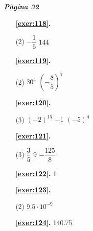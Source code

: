 \hyperlink{page.32}{\textbf{\em Pàgina 32}}
\begin{enumerate}



 \item[\fontfamily{phv}\selectfont\color{blue}\textbf{\ref{exer:118}. }] \label{ans:118}
 \begin{tasks}[column-sep=1em, item-indent=1.3333em](2)
	 \task $-\dfrac {1}{6}$
	 \task $144$
\end{tasks}
 \end{enumerate}
\begin{enumerate}



 \item[\fontfamily{phv}\selectfont\color{blue}\textbf{\ref{exer:119}. }] \label{ans:119}
 \begin{tasks}[column-sep=1em, item-indent=1.3333em](2)
	 \task $30^4$
	 \task* $\left (-\dfrac {8}{5}\right )^7$
\end{tasks}



 \item[\fontfamily{phv}\selectfont\color{blue}\textbf{\ref{exer:120}. }] \label{ans:120}
 \begin{tasks}[column-sep=1em, item-indent=1.3333em](3)
	 \task $(-2)^{15}$
	 \task $-1$
	 \task $(-5)^{4}$
\end{tasks}



 \item[\fontfamily{phv}\selectfont\color{blue}\textbf{\ref{exer:121}. }] \label{ans:121}
 \begin{tasks}[column-sep=1em, item-indent=1.3333em](3)
	 \task $\dfrac {3}{5}$
	 \task $9$
	 \task $-\dfrac {125}{8}$
\end{tasks}
\item[\fontfamily{phv}\selectfont\color{blue}\textbf{\ref{exer:122}. }] \label{ans:122} 
1



 \item[\fontfamily{phv}\selectfont\color{blue}\textbf{\ref{exer:123}. }] \label{ans:123}
 \begin{tasks}[column-sep=1em, item-indent=1.3333em](2)
	 \task $9.5 \cdot 10^{-9}$
\end{tasks}
\item[\fontfamily{phv}\selectfont\color{blue}\textbf{\ref{exer:124}. }] \label{ans:124} 
140.75



\end{enumerate}
